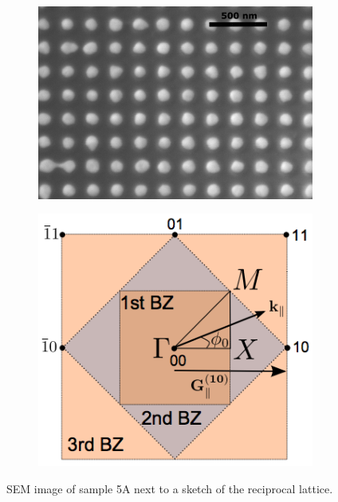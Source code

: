 \begin{figure}
    \begin{subfigure}{0.5\textwidth}
        \flushright
        \includegraphics[width=0.4\linewidth]{figures/Ch3/S5A_SEM.png}
    \end{subfigure}
    \begin{subfigure}{0.5\textwidth}
        \flushleft
        \includegraphics[width=0.33\linewidth]{figures/Ch2/ReciprocalLattice.png}
    \end{subfigure}
    \caption{SEM image of sample 5A next to a sketch of the reciprocal lattice.}
\end{figure}


